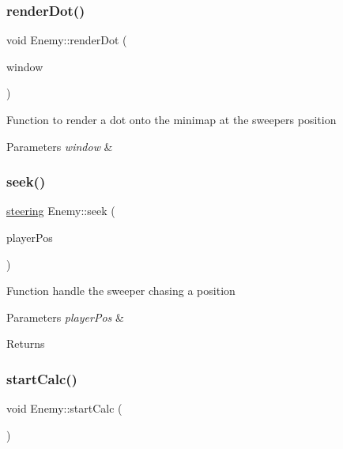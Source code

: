 \subsubsection{\texorpdfstring{renderDot()}{renderDot()}}
{\footnotesize\ttfamily void Enemy\+::render\+Dot (\begin{DoxyParamCaption}\item[{sf\+::\+Render\+Window \&}]{window }\end{DoxyParamCaption})}



Function to render a dot onto the minimap at the sweepers position 


\begin{DoxyParams}{Parameters}
{\em window} & \\
\hline
\end{DoxyParams}
\mbox{\label{class_enemy_afdb365396a2ce0849e81ca838038a78c}} 
\subsubsection{\texorpdfstring{seek()}{seek()}}
{\footnotesize\ttfamily \mbox{\hyperlink{structsteering}{steering}} Enemy\+::seek (\begin{DoxyParamCaption}\item[{sf\+::\+Vector2f}]{player\+Pos }\end{DoxyParamCaption})}



Function handle the sweeper chasing a position 


\begin{DoxyParams}{Parameters}
{\em player\+Pos} & \\
\hline
\end{DoxyParams}
\begin{DoxyReturn}{Returns}

\end{DoxyReturn}
\mbox{\label{class_enemy_a09f98e210a7bbf73fb9e7d7ce671133e}} 
\subsubsection{\texorpdfstring{startCalc()}{startCalc()}}
{\footnotesize\ttfamily void Enemy\+::start\+Calc (\begin{DoxyParamCaption}{ }\end{DoxyParamCaption})}



